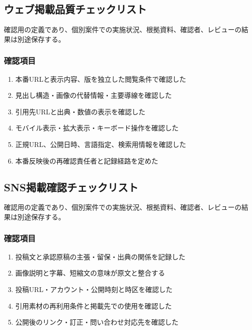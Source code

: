 \documentclass[a4paper,11pt]{article}
\begin{document}
\subsection{ウェブ掲載品質チェックリスト}
\par 確認用の定義であり、個別案件での実施状況、根拠資料、確認者、レビューの結果は別途保存する。\par\medskip
\subsubsection*{確認項目}
\begin{enumerate}[leftmargin=2em,itemsep=0.3em]
\item 本番URLと表示内容、版を独立した閲覧条件で確認した\par
\item 見出し構造・画像の代替情報・主要導線を確認した\par
\item 引用先URLと出典・数値の表示を確認した\par
\item モバイル表示・拡大表示・キーボード操作を確認した\par
\item 正規URL、公開日時、言語指定、検索用情報を確認した\par
\item 本番反映後の再確認責任者と記録経路を定めた\par
\end{enumerate}
\subsection{SNS掲載確認チェックリスト}
\par 確認用の定義であり、個別案件での実施状況、根拠資料、確認者、レビューの結果は別途保存する。\par\medskip
\subsubsection*{確認項目}
\begin{enumerate}[leftmargin=2em,itemsep=0.3em]
\item 投稿文と承認原稿の主張・留保・出典の関係を記録した\par
\item 画像説明と字幕、短縮文の意味が原文と整合する\par
\item 投稿URL・アカウント・公開時刻と時区を確認した\par
\item 引用素材の再利用条件と掲載先での使用を確認した\par
\item 公開後のリンク・訂正・問い合わせ対応先を確認した\par
\end{enumerate}
\end{document}
